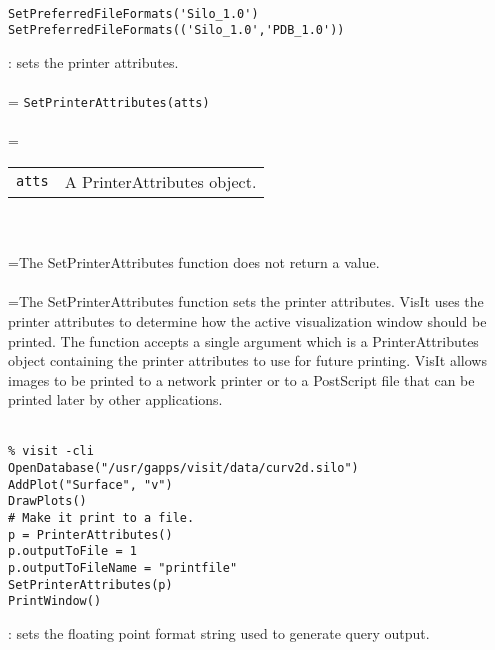 \documentclass[10pt,a4paper]{report}
\begin{document}
\\[-6mm]
\begin{verbatim}SetPreferredFileFormats('Silo_1.0')
SetPreferredFileFormats(('Silo_1.0','PDB_1.0'))
\end{verbatim}
\newpage


{}
: sets the printer attributes.\\[-3mm]

 \\ 
\hangindent=\parindent 
\verb!SetPrinterAttributes(atts)!\\ [-3mm]

 \\ 
\hangindent=\parindent 
\begin{tabular}{ll}
\verb!atts! & A PrinterAttributes object. \\
\end{tabular} \\[-2mm]


 \\ 
\hangindent=\parindent The SetPrinterAttributes function does not return a value. \\[-3mm] 

 \\ 
\hangindent=\parindent The SetPrinterAttributes function sets the printer attributes. VisIt uses the printer attributes to determine how the active visualization window should be printed. The function accepts a single argument which is a PrinterAttributes object containing the printer attributes to use for future printing. VisIt allows images to be printed to a network printer or to a PostScript file that can be printed later by other applications. \\[-3mm] 

\\[-6mm]
\begin{verbatim}% visit -cli
OpenDatabase("/usr/gapps/visit/data/curv2d.silo")
AddPlot("Surface", "v")
DrawPlots()
# Make it print to a file.
p = PrinterAttributes()
p.outputToFile = 1
p.outputToFileName = "printfile"
SetPrinterAttributes(p)
PrintWindow()
\end{verbatim}
\newpage


{}
: sets the floating point format string used to generate query output.\\[-3mm]
\end{document}

